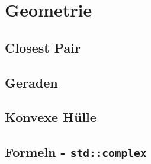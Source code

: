 \section{Geometrie}

\subsection{Closest Pair}


\subsection{Geraden}


\subsection{Konvexe Hülle}


\subsection{Formeln - \lstinline{std::complex}}

